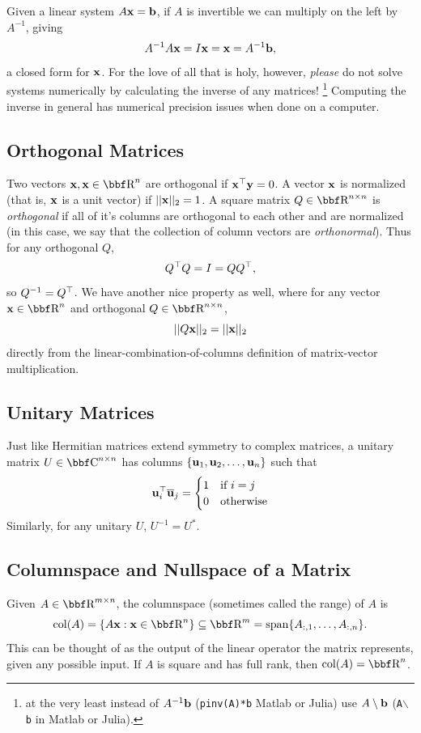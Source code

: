 \documentclass{article}
\begin{document}
Given a linear system $A{\bf x}={\bf b}$, if $A$ is invertible we can multiply on
the left by $A^{-1}$, giving
\[
    A^{-1}A{\bf x} = I{\bf x} = {\bf x} = A^{-1}{\bf b},
\]
a closed form for ${\bf x}$. For the love of all that is holy, however, \textit{please} do
not solve systems numerically by calculating the inverse of any matrices!
\footnote{at the very least instead of $A^{-1}{\bf b}$ (\texttt{pinv(A)*b} Matlab or Julia) use $A\setminus{\bf b}$
(\texttt{A$\backslash$b} in Matlab or Julia).} Computing the inverse in general
has numerical precision issues when done on a computer.

\subsection{Orthogonal Matrices}

Two vectors $\xx,\xx\in\RR^n$ are orthogonal if ${\bf x}^\top{\bf y} = 0$. A vector ${\bf x}$ is normalized (that is,
${\bf x}$ is a unit vector) if $||{\bf x}||_2 = 1$. A square matrix $Q\in\RR^{n\times n}$ is \textit{orthogonal}
if all of it's columns are orthogonal to each other and are normalized (in this case, we say that
the collection of column vectors are \textit{orthonormal}). Thus for any orthogonal $Q$,
\[
    Q^\top Q = I = QQ^\top,
\]
so $Q^{-1} = Q^\top$. We have another nice property as well, where for any vector $\xx\in\RR^{n}$
and orthogonal $Q\in\RR^{n\times n}$,
\[
    ||Q{\bf x}||_2 = ||{\bf x}||_2
\]
directly from the linear-combination-of-columns definition of matrix-vector multiplication.

\subsection{Unitary Matrices}

Just like Hermitian matrices extend symmetry to complex matrices, a unitary matrix
$U\in\CC^{n\times n}$ has columns $\{{\bf u}_1,{\bf u}_2,\dots,{\bf u}_n\}$ such that
\[
    {\bf u}_i^\top\overline{{\bf u}}_j = \begin{cases}
        1 & \text{if $i=j$}\\
        0 & \text{otherwise}
    \end{cases}
\]
Similarly, for any unitary $U$, $U^{-1} = U^*$.

\subsection{Columnspace and Nullspace of a Matrix}

Given $A\in\RR^{m\times n}$, the columnspace (sometimes
called the range) of $A$ is
\[
    \mathrm{col}(A) = \left\{A\xx : \xx\in\RR^n\right\} \subseteq \RR^m = \mathrm{span}\{A_{:,1}, \dots, A_{:,n}\}.
\]
This can be thought of as the output of the linear operator
the matrix represents, given any possible input. If $A$ is
square and has full rank, then $\mathrm{col}(A) = \RR^n$.\\
\end{document}
